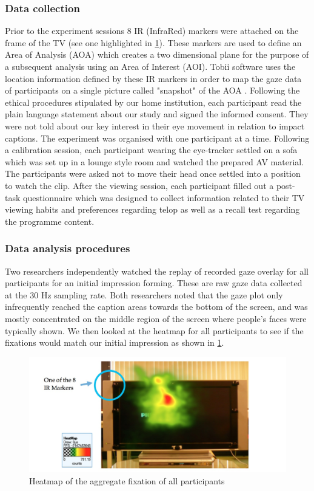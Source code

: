 \documentclass[output=paper]{langsci/langscibook}
\begin{document}
\subsubsection{Data collection}

Prior to the experiment sessions 8 IR (InfraRed) markers were attached on the frame of the TV (see one highlighted in \ref{fig:2}). These markers are used to define an Area of Analysis (AOA) which creates a two dimensional plane for the purpose of a subsequent analysis using an Area of Interest (AOI).  Tobii software uses the location information defined by these IR markers in order to map the gaze data of participants on a single picture called "snapshot" of the AOA \citep{Tobii2012}. Following the ethical procedures stipulated by our home institution, each participant read the plain language statement about our study and signed the informed consent. They were not told about our key interest in their eye movement in relation to impact captions. The experiment was organised with one participant at a time. Following a calibration session, each participant wearing the eye-tracker settled on a sofa which was set up in a lounge style room and watched the prepared AV material.  The participants were asked not to move their head once settled into a position to watch the clip. After the viewing session, each participant filled out a post-task questionnaire which was designed to collect information related to their TV viewing habits and preferences regarding telop as well as a recall test regarding the programme content.  

\subsubsection{Data analysis procedures}

Two researchers independently watched the replay of recorded gaze overlay for all participants for an initial impression forming.  These are raw gaze data collected at the 30 Hz sampling rate.  Both researchers noted that the gaze plot only infrequently reached the caption areas towards the bottom of the screen, and was mostly concentrated on the middle region of the screen where people's faces were typically shown. We then looked at the heatmap for all participants to see if the fixations would match our initial impression as shown in \ref{fig:2}. 

\begin{figure}
 \includegraphics[width=\textwidth]{figures/OHagan2.png}
 \caption{Heatmap of the aggregate fixation of all participants}
 \label{fig:2}
\end{figure}
\end{document}
